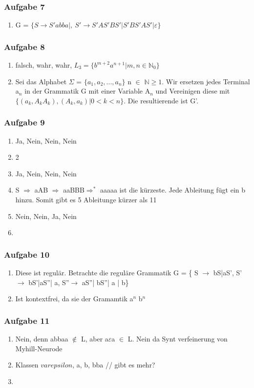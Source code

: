 \documentclass[12pt]{scrartcl}
\begin{document}
\subsubsection{Aufgabe 7}
	\begin{enumerate}
		\item G = \(\{S \rightarrow S'abba | ,\ S' \rightarrow S'AS'BS'| S'BS'AS'|\varepsilon \}\)
	\end{enumerate}

\subsubsection{Aufgabe 8}
	\begin{enumerate}
		\item falsch, wahr, wahr, \(L_3=\{ b^{m+2} a^{n+1}| m,n \in \mathbb{N}_0 \}  \)
		\item Sei das Alphabet $\Sigma$ = \(\{a_1, a_2, ..., a_n  \}\) n $\in$ $\mathbb{N}\ge 1$. Wir ersetzen jedes Terminal a$_n$ in der Grammatik G mit einer Variable A$_n$ und Vereinigen diese mit\(\{ (a_k,A_k A_k),(A_k,a_k)| 0 < k < n \}\). Die resultierende ist G'.
	\end{enumerate}
	
\subsubsection{Aufgabe 9}
	\begin{enumerate}
		\item Ja, Nein, Nein, Nein
		\item 2
		\item Ja, Nein, Nein, Nein
		\item S $\Rightarrow$ aAB $\Rightarrow$ aaBBB$\Rightarrow^{*}$ aaaaa ist die kürzeste. Jede Ableitung fügt ein b hinzu. Somit gibt es 5 Ableitunge kürzer als 11
	\item Nein, Nein, Ja, Nein
	\item
	\end{enumerate}
\subsubsection{Aufgabe 10}
	\begin{enumerate}
		\item Diese ist regulär. Betrachte die reguläre Grammatik G = \{ S $\rightarrow$ bS|aS', S' $\rightarrow$ bS'|aS''| a, S''$\rightarrow$ aS''| bS''| a | b\}
		\item Ist kontextfrei, da sie der Gramamtik a$^{n}$ b$^{n}$
	\end{enumerate}
	
\subsubsection{Aufgabe 11}
\begin{enumerate}
	\item Nein, denn abbaa $\notin$ L, aber a$\varepsilon$a $\in$ L. Nein da Synt verfeinerung von Myhill-Neurode
	\item Klassen $varepsilon$, a, b, bba // gibt es mehr?
	\item 
\end{enumerate}
\end{document}

